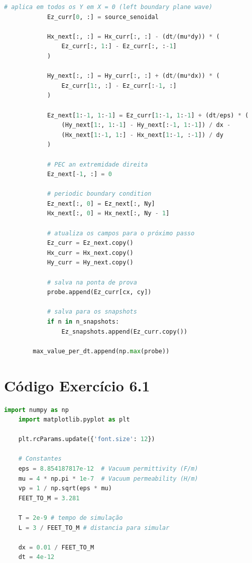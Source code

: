 \begin{anexosenv}
\begin{lstlisting}[language=Python, breaklines=true, basicstyle=\tiny]
            # aplica em todos os Y em X = 0 (left boundary plane wave)
            Ez_curr[0, :] = source_senoidal

            Hx_next[:, :] = Hx_curr[:, :] - (dt/(mu*dy)) * (
                Ez_curr[:, 1:] - Ez_curr[:, :-1]
            )

            Hy_next[:, :] = Hy_curr[:, :] + (dt/(mu*dx)) * (
                Ez_curr[1:, :] - Ez_curr[:-1, :]
            )

            Ez_next[1:-1, 1:-1] = Ez_curr[1:-1, 1:-1] + (dt/eps) * (
                (Hy_next[1:, 1:-1] - Hy_next[:-1, 1:-1]) / dx -
                (Hx_next[1:-1, 1:] - Hx_next[1:-1, :-1]) / dy
            )

            # PEC an extremidade direita
            Ez_next[-1, :] = 0

            # periodic boundary condition
            Ez_next[:, 0] = Ez_next[:, Ny]
            Hx_next[:, 0] = Hx_next[:, Ny - 1]

            # atualiza os campos para o próximo passo
            Ez_curr = Ez_next.copy()
            Hx_curr = Hx_next.copy()
            Hy_curr = Hy_next.copy()

            # salva na ponta de prova
            probe.append(Ez_curr[cx, cy])

            # salva para os snapshots
            if n in n_snapshots:
                Ez_snapshots.append(Ez_curr.copy())

        max_value_per_dt.append(np.max(probe))

    \end{lstlisting}


    \chapter{Código Exercício 6.1}\label{cap:ex6-1-codigo}
    \begin{lstlisting}[language=Python, breaklines=true, basicstyle=\tiny]
    import numpy as np
    import matplotlib.pyplot as plt

    plt.rcParams.update({'font.size': 12}) 

    # Constantes
    eps = 8.854187817e-12  # Vacuum permittivity (F/m)
    mu = 4 * np.pi * 1e-7  # Vacuum permeability (H/m)
    vp = 1 / np.sqrt(eps * mu)
    FEET_TO_M = 3.281

    T = 2e-9 # tempo de simulação 
    L = 3 / FEET_TO_M # distancia para simular

    dx = 0.01 / FEET_TO_M
    dt = 4e-12


\end{lstlisting}
\end{anexosenv}
